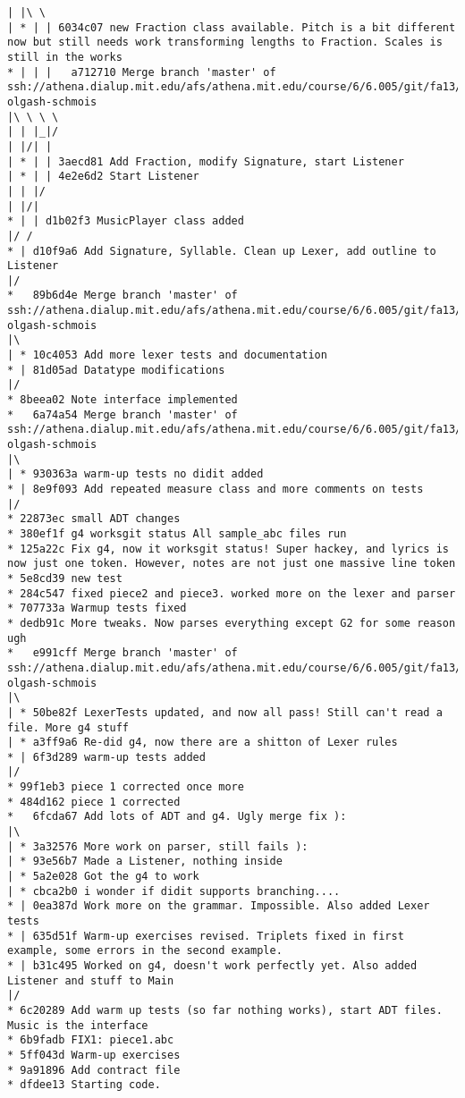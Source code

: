 \documentclass[12pt]{book}
\begin{document}
\begin{verbatim}
| |\ \
| * | | 6034c07 new Fraction class available. Pitch is a bit different now but still needs work transforming lengths to Fraction. Scales is still in the works
* | | |   a712710 Merge branch 'master' of ssh://athena.dialup.mit.edu/afs/athena.mit.edu/course/6/6.005/git/fa13/projects/abcplayer/aivanov-olgash-schmois
|\ \ \ \
| | |_|/
| |/| |
| * | | 3aecd81 Add Fraction, modify Signature, start Listener
| * | | 4e2e6d2 Start Listener
| | |/
| |/|
* | | d1b02f3 MusicPlayer class added
|/ /
* | d10f9a6 Add Signature, Syllable. Clean up Lexer, add outline to Listener
|/
*   89b6d4e Merge branch 'master' of ssh://athena.dialup.mit.edu/afs/athena.mit.edu/course/6/6.005/git/fa13/projects/abcplayer/aivanov-olgash-schmois
|\
| * 10c4053 Add more lexer tests and documentation
* | 81d05ad Datatype modifications
|/
* 8beea02 Note interface implemented
*   6a74a54 Merge branch 'master' of ssh://athena.dialup.mit.edu/afs/athena.mit.edu/course/6/6.005/git/fa13/projects/abcplayer/aivanov-olgash-schmois
|\
| * 930363a warm-up tests no didit added
* | 8e9f093 Add repeated measure class and more comments on tests
|/
* 22873ec small ADT changes
* 380ef1f g4 worksgit status All sample_abc files run
* 125a22c Fix g4, now it worksgit status! Super hackey, and lyrics is now just one token. However, notes are not just one massive line token
* 5e8cd39 new test
* 284c547 fixed piece2 and piece3. worked more on the lexer and parser
* 707733a Warmup tests fixed
* dedb91c More tweaks. Now parses everything except G2 for some reason ugh
*   e991cff Merge branch 'master' of ssh://athena.dialup.mit.edu/afs/athena.mit.edu/course/6/6.005/git/fa13/projects/abcplayer/aivanov-olgash-schmois
|\
| * 50be82f LexerTests updated, and now all pass! Still can't read a file. More g4 stuff
| * a3ff9a6 Re-did g4, now there are a shitton of Lexer rules
* | 6f3d289 warm-up tests added
|/
* 99f1eb3 piece 1 corrected once more
* 484d162 piece 1 corrected
*   6fcda67 Add lots of ADT and g4. Ugly merge fix ):
|\
| * 3a32576 More work on parser, still fails ):
| * 93e56b7 Made a Listener, nothing inside
| * 5a2e028 Got the g4 to work
| * cbca2b0 i wonder if didit supports branching....
* | 0ea387d Work more on the grammar. Impossible. Also added Lexer tests
* | 635d51f Warm-up exercises revised. Triplets fixed in first example, some errors in the second example.
* | b31c495 Worked on g4, doesn't work perfectly yet. Also added Listener and stuff to Main
|/
* 6c20289 Add warm up tests (so far nothing works), start ADT files. Music is the interface
* 6b9fadb FIX1: piece1.abc
* 5ff043d Warm-up exercises
* 9a91896 Add contract file
* dfdee13 Starting code.

\end{verbatim}






\bigskip


      
      
\end{document}
